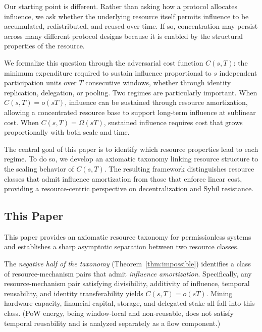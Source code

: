 \documentclass[manuscript,review]{acmart}
\theoremstyle{remark}
\begin{document}
	Our starting point is different. Rather than asking how a
	protocol allocates influence, we ask whether the underlying
	resource itself permits influence to be accumulated,
	redistributed, and reused over time. If so, concentration
	may persist across many different protocol designs because
	it is enabled by the structural properties of the resource.
	
	We formalize this question through the adversarial cost
	function $C(s,T)$: the minimum expenditure required to
	sustain influence proportional to $s$ independent
	participation units over $T$ consecutive windows, whether
	through identity replication, delegation, or pooling.
	Two regimes are particularly important. When
	$C(s,T)=o(sT)$, influence can be sustained through
	resource amortization, allowing a concentrated resource
	base to support long-term influence at sublinear cost.
	When $C(s,T)=\Omega(sT)$, sustained influence requires
	cost that grows proportionally with both scale and time.
	
	The central goal of this paper is to identify which
	resource properties lead to each regime. To do so, we
	develop an axiomatic taxonomy linking resource structure
	to the scaling behavior of $C(s,T)$. The resulting
	framework distinguishes resource classes that admit
	influence amortization from those that enforce linear
	cost, providing a resource-centric perspective on
	decentralization and Sybil resistance.
	
	
	
	\subsection{This Paper}
	\label{ssec:thispaper}
	
	This paper provides an axiomatic resource taxonomy for
	permissionless systems and establishes a sharp asymptotic
	separation between two resource classes.
	
	The \emph{negative half of the taxonomy}
	(Theorem~\ref{thm:impossible}) identifies a class of
	resource-mechanism pairs that admit \emph{influence
		amortization}. Specifically, any resource-mechanism pair
	satisfying divisibility, additivity of influence, temporal
	reusability, and identity transferability yields
	$C(s,T)=o(sT)$.
	Mining hardware capacity, financial capital, storage, and
	delegated stake all fall into this class. (PoW energy,
	being window-local and non-reusable, does not satisfy
	temporal reusability and is analyzed separately as a flow
	component.)
	
\end{document}
